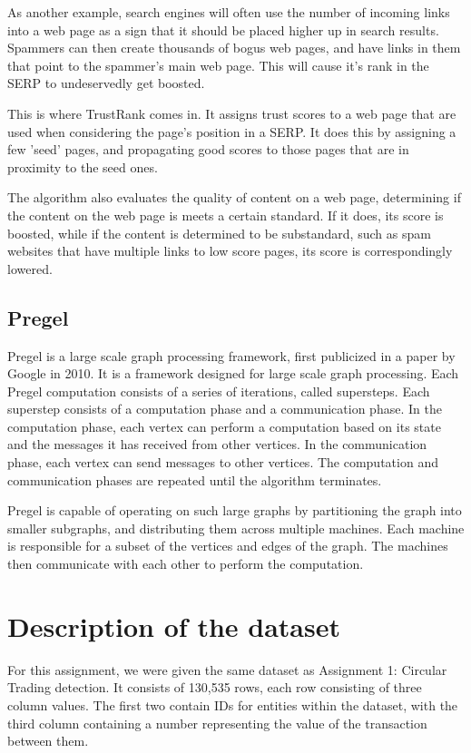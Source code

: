 \documentclass[conference]{IEEEtran}
\begin{document}
As another example, search engines will often use the number of incoming links into a web page as a sign that it should be placed higher up in search results. Spammers can then create thousands of bogus web pages, and have links in them that point to the spammer's main web page. This will cause it's rank in the SERP to undeservedly get boosted.

This is where TrustRank comes in. It assigns trust scores to a web page that are used when considering the page's position in a SERP. It does this by assigning a few 'seed' pages, and propagating good scores to those pages that are in proximity to the seed ones.

The algorithm also evaluates the quality of content on a web page, determining if the content on the web page is meets a certain standard. If it does, its score is boosted, while if the content is determined to be substandard, such as spam websites that have multiple links to low score pages, its score is correspondingly lowered.


\subsection{Pregel}
Pregel is a large scale graph processing framework, first publicized in a paper by Google in 2010. It is a framework designed for large scale graph processing. Each Pregel computation consists of a series of iterations, called supersteps. Each superstep consists of a computation phase and a communication phase. In the computation phase, each vertex can perform a computation based on its state and the messages it has received from other vertices. In the communication phase, each vertex can send messages to other vertices. The computation and communication phases are repeated until the algorithm terminates.

Pregel is capable of operating on such large graphs by partitioning the graph into smaller subgraphs, and distributing them across multiple machines. Each machine is responsible for a subset of the vertices and edges of the graph. The machines then communicate with each other to perform the computation.

\section{Description of the dataset}
For this assignment, we were given the same dataset as Assignment 1: Circular Trading detection. It consists of 130,535 rows, each row consisting of three column values. The first two contain IDs for entities within the dataset, with the third column containing a number representing the value of the transaction between them.
\end{document}
